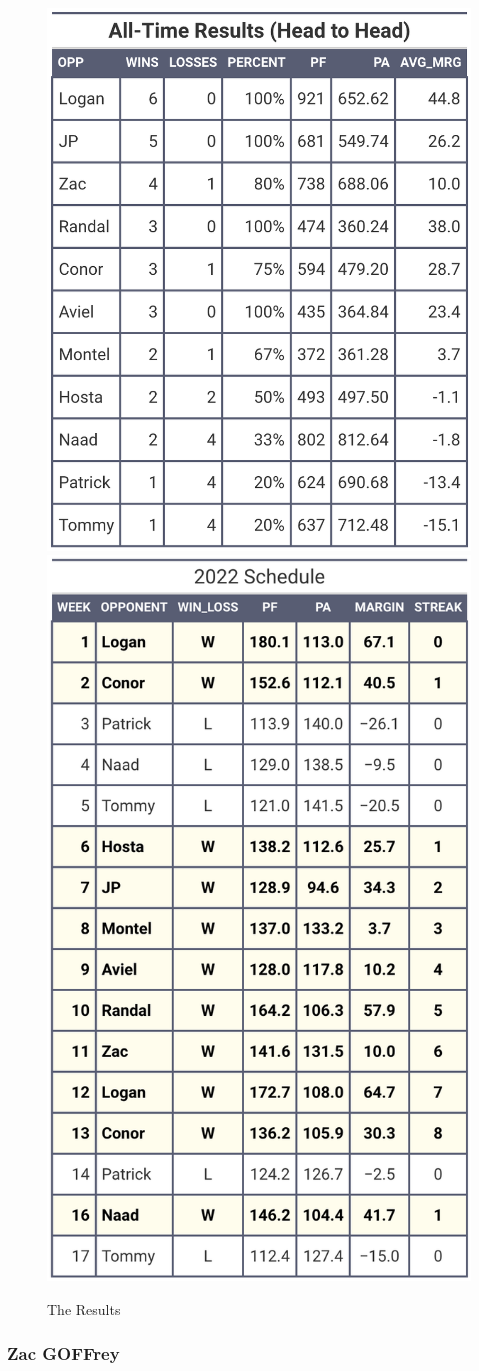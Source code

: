 \documentclass[
]{article}
\begin{document}
\begin{figure}
\includegraphics[width=0.5\linewidth,height=0.5\textheight]{output/headtohead/Tom_head_to_head} \includegraphics[width=0.5\linewidth,height=0.5\textheight]{output/py_schedule/season_results_Tom} \caption{The Results}\label{fig:unnamed-chunk-19}
\end{figure}

\hypertarget{zac-goffrey}{%
\subsubsection{Zac GOFFrey}\label{zac-goffrey}}
\end{document}
